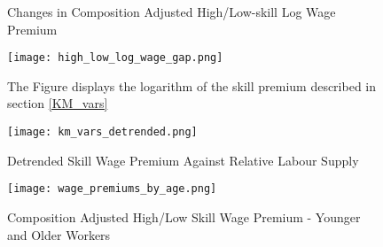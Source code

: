 \documentclass[11pt]{article}
\begin{document}
\begin{figure}[!htbp]%
    \centering
    \caption{Changes in Composition Adjusted High/Low-skill Log Wage Premium}
    {\texttt{[image: high\_low\_log\_wage\_gap.png]}}
    \label{high_low_log_wage_gap}
    \caption*{\footnotesize The Figure displays the logarithm of the skill premium described in section \ref{KM_vars}}
\end{figure}


\begin{figure}[!htbp]%
    \centering
    \caption{Detrended Skill Wage Premium Against Relative Labour Supply}
    {\texttt{[image: km\_vars\_detrended.png]} }
    \label{km_vars_detrended}
\end{figure}


\begin{figure}[!htbp]%
    \centering
    \caption{Composition Adjusted High/Low Skill Wage Premium -  Younger and Older Workers}
    {\texttt{[image: wage\_premiums\_by\_age.png]} }
    \label{wage_premiums_by_age}
\end{figure}


\FloatBarrier
\end{document}
